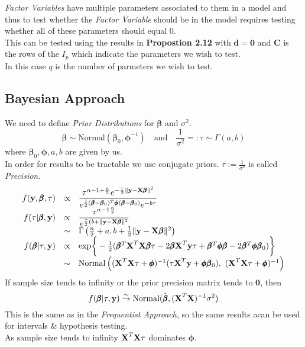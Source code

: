 \documentclass[11pt,a4paper]{article}
\begin{document}
\textit{Factor Variables} have multiple parameters associated to them in a model and thus to test whether the \textit{Factor Variable} should be in the model requires testing whether all of these parameters should equal 0.\\
This can be tested using the results in \textbf{Propostion 2.12} with $\textbf{d}=\pmb0$ and $\textbf{C}$ is the rows of the $I_p$ which indicate the parameters we wish to test.\\
In this case $q$ is the number of parmeters we wish to test.

\subsection{Bayesian Approach}

We need to define \textit{Prior Distributions} for $\pmb\beta$ and $\sigma^2$.
$$\pmb\beta\sim\text{Normal}(\pmb\beta_0,\pmb\phi^{-1})\quad\text{and}\quad\frac1{\sigma^2}=:\tau\sim\Gamma(a,b)$$
where $\pmb\beta_0,\pmb\phi,a,b$ are given by us.\\
\nb In order for results to be tractable we use conjugate priors. $\tau:=\frac1{\sigma^2}$ is called \textit{Precision}.\\

\[\begin{array}{rcl}
f(\textbf{y},\pmb\beta,\tau)&\propto&\displaystyle\frac{\tau^{\alpha-1+\frac{n}2}e^{-\frac\tau2\|\textbf{y}-\X\pmb\beta\|^2}}{e^{\frac12(\pmb\beta-\pmb\beta_0)^T\pmb\phi(\pmb\beta-\pmb\beta_0)}e^{-b\tau}}\\
f(\tau|\pmb\beta,\textbf{y})&\propto&\dfrac{\tau^{\alpha-1\frac{n}2}}{e^{\frac\tau2(b+\|\textbf{y}-\X\pmb\beta\|^2}}\\
&\sim&\Gamma\left(\frac{n}2+a,b+\frac12\|\textbf{y}-\X\pmb\beta\|^2\right)\\
f(\pmb\beta|\tau,\textbf{y})&\propto&\text{exp}\bigg\{-\frac12(\pmb\beta^T\X^T\X\pmb\beta\tau-2\pmb\beta\X^T\textbf{y}\tau+\pmb\beta^T\pmb\phi\pmb\beta-2\pmb\beta^T\pmb\phi\pmb\beta_0)\bigg\}\\
&\sim&\text{Normal}\left((\X^T\X\tau+\pmb\phi)^{-1}(\tau\X^T\textbf{y}+\pmb\phi\pmb\beta_0),\ (\X^T\X\tau+\pmb\phi)^{-1}\right)
\end{array}\]
If sample size tends to infinity or the prior precision matrix tends to $\pmb0$, then $$f(\pmb\beta|\tau,\textbf{y})\overset\sim\to\text{Normal}(\hat{\pmb\beta},(\textbf{X}^T\textbf{X})^{-1}\sigma^2)$$
This is the same as in the \textit{Frequentist Approach}, so the same results acan be used for intervals \& hypothesis testing.\\
\nb As sample size tends to infinity $\textbf{X}^T\textbf{X}\tau$ dominates $\pmb\phi$.\\
\end{document}
